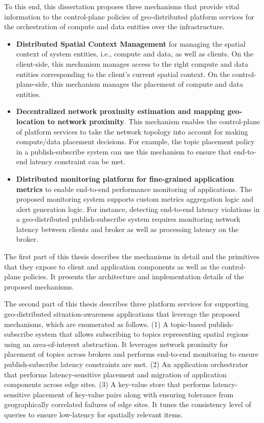 \begin{summary}
\par To this end, this dissertation proposes three mechanisms that provide vital information to the control-plane policies of geo-distributed platform services for the orchestration of compute and data entities over the infrastructure. 
\begin{itemize}
\item \textbf{Distributed Spatial Context Management} for managing the spatial context of system entities, i.e., compute and data, as well as clients. On the client-side, this mechanism manages access to the right compute and data entities corresponding to the client's current spatial context. On the control-plane-side, this mechanism manages the placement of compute and data entities.
\item \textbf{Decentralized network proximity estimation and mapping geo-location to network proximity}. This mechanism enables the control-plane of platform services to take the network topology into account for making compute/data placement decisions. For example, the topic placement policy in a publish-subscribe system can use this mechanism to ensure that end-to-end latency constraint can be met.
\item \textbf{Distributed monitoring platform for fine-grained application metrics} to enable end-to-end performance monitoring of applications. The proposed monitoring system supports custom metrics aggregation logic and alert generation logic. For instance, detecting end-to-end latency violations in a geo-distributed publish-subscribe system requires monitoring network latency between clients and broker as well as processing latency on the broker. 
\end{itemize}

The first part of this thesis describes the mechanisms in detail and the primitives that they expose to client and application components as well as the control-plane policies. It presents the architecture and implementation details of the proposed mechanisms.

The second part of this thesis describes three platform services for supporting geo-distributed situation-awareness applications that leverage the proposed mechanisms, which are enumerated as follows. (1) A topic-based publish-subscribe system that allows subscribing to topics representing spatial regions using an area-of-interest abstraction. It leverages network proximity for placement of topics across brokers and performs end-to-end monitoring to ensure publish-subscribe latency constraints are met. (2) An application orchestrator that performs latency-sensitive placement and migration of application components across edge sites. (3) A key-value store that performs latency-sensitive placement of key-value pairs along with ensuring tolerance from geographically correlated failures of edge sites. It tunes the consistency level of queries to ensure low-latency for spatially relevant items.

\end{summary}